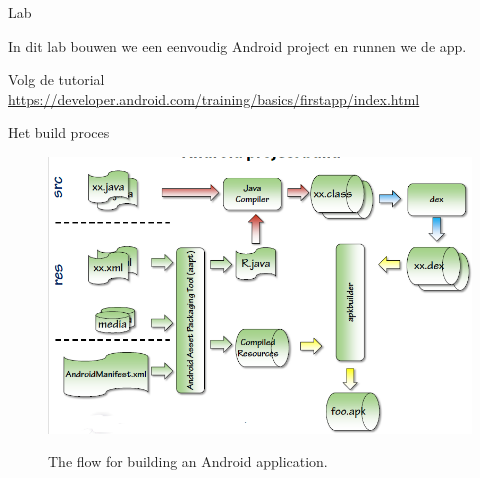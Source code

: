 \documentclass{beamer}
\begin{document}
\begin{frame}{Lab}

	In dit lab bouwen we een eenvoudig Android project en runnen we de app.
	

		Volg de tutorial \url{https://developer.android.com/training/basics/firstapp/index.html}

	

\end{frame}
\begin{frame}[fragile]{Het build proces}

	\begin{figure}[hb]
		\includegraphics[width=\textwidth]{img/hello/buildproces.PNG}
		\label{fig:develop}
		\caption{The flow for building an Android application. }
	\end{figure}

\end{frame}
\end{document}
